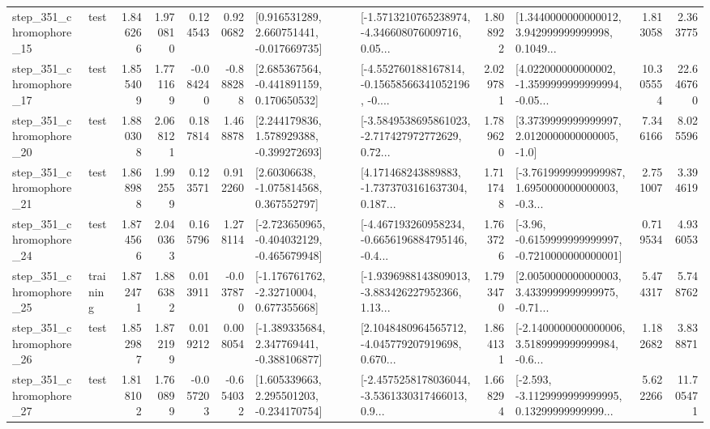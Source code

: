\begin{tabular}{llrrrrllrlrr}
  step\_351\_chromophore\_15 &      test &      1.846266 &    1.970810 &      0.124543 &  0.920682 &    [0.916531289, 2.660751441, -0.017669735] &  [-1.5713210765238974, -4.346608076009716, 0.05... &       1.808922 &  [1.3440000000000012, 3.942999999999998, 0.1049... &            1.813058 &          2.363775 \\
  step\_351\_chromophore\_17 &      test &      1.855409 &    1.771169 &     -0.084240 & -0.888288 &    [2.685367564, -0.441891159, 0.170650532] &  [-4.552760188167814, -0.15658566341052196, -0.... &       2.029781 &  [4.022000000000002, -1.3599999999999994, -0.05... &           10.305554 &         22.646760 \\
  step\_351\_chromophore\_20 &      test &      1.880308 &    2.068121 &      0.187814 &  1.468878 &    [2.244179836, 1.578929388, -0.399272693] &  [-3.5849538695861023, -2.717427972772629, 0.72... &       1.789620 &     [3.3739999999999997, 2.0120000000000005, -1.0] &            7.346166 &          8.025596 \\
  step\_351\_chromophore\_21 &      test &      1.868988 &    1.992559 &      0.123571 &  0.912260 &     [2.60306638, -1.075814568, 0.367552797] &  [4.171468243889883, -1.7373703161637304, 0.187... &       1.711748 &  [-3.7619999999999987, 1.6950000000000003, -0.3... &            2.751007 &          3.394619 \\
  step\_351\_chromophore\_24 &      test &      1.874566 &    2.040363 &      0.165796 &  1.278114 &  [-2.723650965, -0.404032129, -0.465679948] &  [-4.467193260958234, -0.6656196884795146, -0.4... &       1.763726 &  [-3.96, -0.6159999999999997, -0.7210000000000001] &            0.719534 &          4.936053 \\
  step\_351\_chromophore\_25 &  training &      1.872471 &    1.886382 &      0.013911 & -0.037870 &    [-1.176761762, -2.32710004, 0.677355668] &  [-1.9396988143809013, -3.883426227952366, 1.13... &       1.793470 &  [2.0050000000000003, 3.4339999999999975, -0.71... &            5.474317 &          5.748762 \\
  step\_351\_chromophore\_26 &      test &      1.852987 &    1.872199 &      0.019212 &  0.008054 &   [-1.389335684, 2.347769441, -0.388106877] &  [2.1048480964565712, -4.045779207919698, 0.670... &       1.864131 &  [-2.1400000000000006, 3.5189999999999984, -0.6... &            1.182682 &          3.838871 \\
  step\_351\_chromophore\_27 &      test &      1.818102 &    1.760899 &     -0.057203 & -0.654032 &    [1.605339663, 2.295501203, -0.234170754] &  [-2.4575258178036044, -3.5361330317466013, 0.9... &       1.668294 &  [-2.593, -3.1129999999999995, 0.13299999999999... &            5.622266 &         11.705471 \\

\end{tabular}
